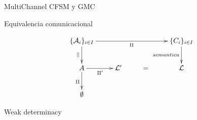 \documentclass[10pt,xcolor={table,dvipsnames},t]{beamer}
\begin{document}
\begin{frame}{MultiChannel CFSM y GMC}
    
\end{frame}

\begin{frame}{Equivalencia comunicacional}

\begin{figure}[H]
$$
\xymatrix{   
	\{\mathcal{A}_i\}_{i \in I} \ar[rrr]_{\Pi} \ar[d]_{||} & & & \{C_i\}_{i \in I}  \ar[d]_{semantica}  \\
	  {A} \ar[r]_{\Pi'} \ar[d]_{\Pi} & \mathcal{L}' & = & {\mathcal{L}}  \\
	  \emptyset
}
$$
\end{figure}
    
\end{frame}

\begin{frame}{Weak determinacy}
    
\end{frame}
\end{document}
